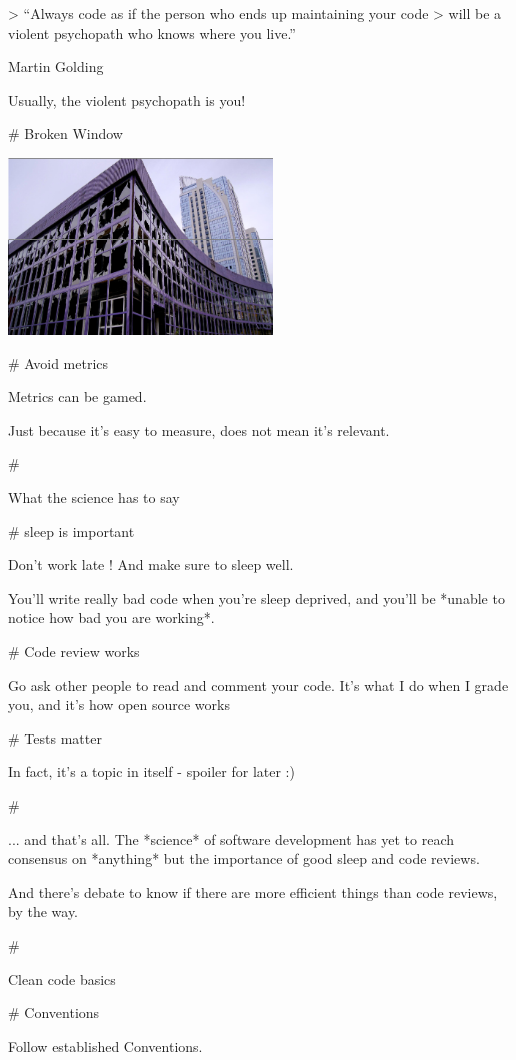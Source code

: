 > “Always code as if the person who ends up maintaining your code
> will be a violent psychopath who knows where you live.”

Martin Golding

Usually, the violent psychopath is you!

# Broken Window

\includegraphics[width=7cm]{broken-windows.png}

# Avoid metrics

Metrics can be gamed.

Just because it's easy to measure, does not mean it's relevant.

#

\huge \center What the science has to say


# sleep is important

Don't work late ! And make sure to sleep well.

\vfill

You'll write really bad code when you're sleep deprived, and you'll be
*unable to notice how bad you are working*.

# Code review works

Go ask other people to read and comment your code. It's what I do when I
grade you, and it's how open source works

# Tests matter

In fact, it's a topic in itself - spoiler for later :)

#

... and that's all. The *science* of software development has yet to reach
consensus on *anything* but the importance of good sleep and code reviews.

And there's debate to know if there are more efficient things than code
reviews, by the way.


#

\huge \center Clean code basics

# Conventions

Follow established Conventions.

